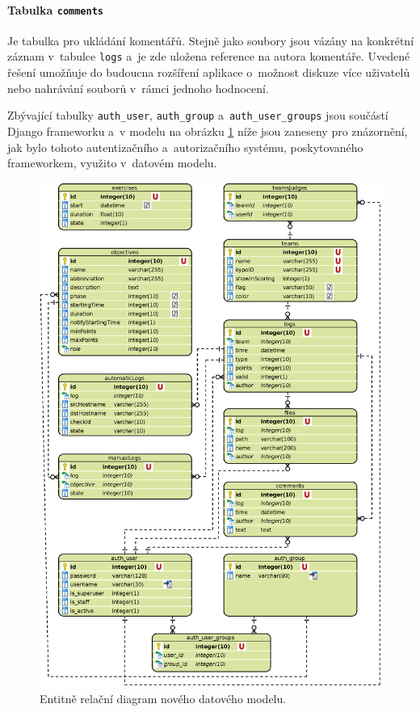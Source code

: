 \documentclass[
  digital,
  twoside,
  table, 
  nolof, 
  nolot
]{fithesis3}
\begin{document}
\paragraph{Tabulka \texttt{comments}} Je tabulka pro ukládání komentářů. Stejně jako soubory jsou vázány na konkrétní záznam v~tabulce \texttt{logs} a~je zde uložena reference na autora komentáře. Uvedené řešení umožňuje do budoucna rozšíření aplikace o~možnost diskuze více uživatelů nebo nahrávání souborů v~rámci jednoho hodnocení.

Zbývající tabulky \texttt{auth\_user}, \texttt{auth\_group} a~\texttt{auth\_user\_groups} jsou součástí Django frameworku a~v modelu na obrázku \ref{fig:erdNewApp} níže jsou zaneseny pro znázornění, jak bylo tohoto autentizačního a~autorizačního systému, poskytovaného frameworkem, využito v~datovém modelu.

\begin{figure}
    \centering
    \includegraphics[width=12.5cm]{images/ERD-new-app.eps}
    \caption{Entitně relační diagram nového datového modelu.}
    \label{fig:erdNewApp}
\end{figure}
\end{document}
